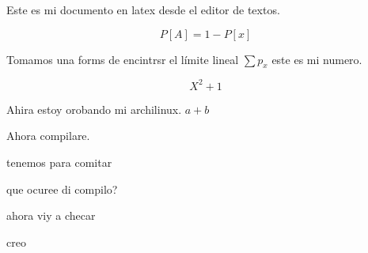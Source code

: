 \documentclass{article}
\begin{document}
Este es mi documento en latex desde el editor de textos. 

\begin{displaymath} 
 P[A] = 1 - P[x] 
\end{displaymath} 

 Tomamos una forms de encintrsr el límite lineal
 $ \sum p_x $  este es mi numero.
 
 \begin{displaymath}
    X^2 + 1
 \end{displaymath}
 
 Ahira estoy orobando mi archilinux. $a +b $ 
 
 Ahora compilare. 
 
 
 tenemos para comitar
 
 
 que ocuree di compilo?
 
 ahora viy a checar
 
 creo
\end{document}

